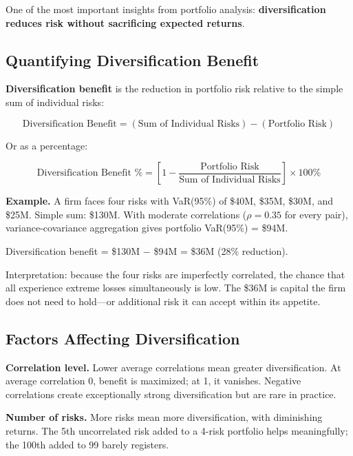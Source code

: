 \documentclass[11pt,openany]{book}
\begin{document}
One of the most important insights from portfolio analysis:
\textbf{diversification reduces risk without sacrificing expected returns}.

\subsection{Quantifying Diversification Benefit}
\label{subsec:quantifying-diversification}

\textbf{Diversification benefit} is the reduction in portfolio risk relative
to the simple sum of individual risks:

\[
\text{Diversification Benefit}
  = \left(\text{Sum of Individual Risks}\right)
  - \left(\text{Portfolio Risk}\right)
\]

Or as a percentage:

\[
\text{Diversification Benefit \%}
  = \left[1 - \frac{\text{Portfolio Risk}}
                   {\text{Sum of Individual Risks}}\right] \times 100\%
\]

\textbf{Example.} A firm faces four risks with VaR(95\%) of \$40M, \$35M,
\$30M, and \$25M. Simple sum: \$130M. With moderate correlations
(\(\rho = 0.35\) for every pair), variance-covariance aggregation gives
portfolio VaR(95\%) = \$94M.

Diversification benefit = \$130M \(-\) \$94M = \$36M (28\% reduction).

Interpretation: because the four risks are imperfectly correlated, the chance
that all experience extreme losses simultaneously is low. The \$36M is capital
the firm does not need to hold---or additional risk it can accept within its
appetite.

\subsection{Factors Affecting Diversification}
\label{subsec:diversification-factors}

\textbf{Correlation level.} Lower average correlations mean greater
diversification. At average correlation 0, benefit is maximized; at 1, it
vanishes. Negative correlations create exceptionally strong diversification
but are rare in practice.

\textbf{Number of risks.} More risks mean more diversification, with
diminishing returns. The 5th uncorrelated risk added to a 4-risk portfolio
helps meaningfully; the 100th added to 99 barely registers.
\end{document}
